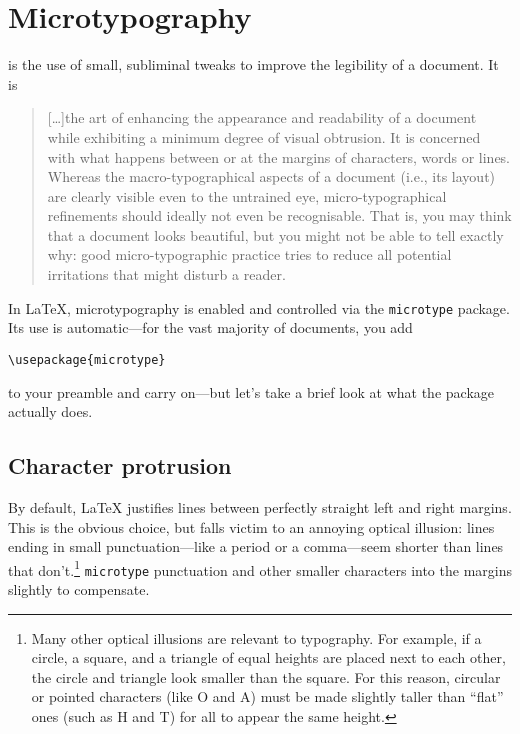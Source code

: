 \chapter{Microtypography}

 is the use of small, subliminal tweaks to improve
the legibility of a document. It is
\begin{quote}
[\ldots]the art of enhancing the appearance and readability of a
document while exhibiting a minimum degree of visual obtrusion.
It is concerned with what happens between or at the margins of characters,
words or lines. Whereas the macro-typographical aspects of a document
(i.e., its layout) are clearly visible even to the untrained eye,
micro-typographical refinements should ideally not even be recognisable.
That is, you may think that a document looks beautiful, but you
might not be able to tell exactly why: good micro-typographic practice tries to
reduce all potential irritations that might disturb a reader.\punckern{}
\end{quote}

In \LaTeX{}, microtypography is enabled and controlled via the
\texttt{microtype} package.
Its use is automatic---for the vast majority of documents, you add
\begin{leftfigure}
\begin{lstlisting}
\usepackage{microtype}
\end{lstlisting}
\end{leftfigure}
to your preamble and carry on---but let's take a brief look at what the package
actually does.

\section{Character protrusion}

By default, \LaTeX{} justifies lines between perfectly straight
left and right margins.
This is the obvious choice,
but falls victim to an annoying optical illusion:
lines ending in small punctuation---like a period or a
comma---seem shorter than lines that
don't.\punckern\footnote{Many other optical illusions are
relevant to typography. For example, if a circle, a square, and a triangle
of equal heights are placed next to each other,
the circle and triangle look smaller than the square.
For this reason, circular or pointed characters (like O and A) must
be made slightly taller than ``flat'' ones (such as H and T) for all
to appear the same height.\punckern{}}
\texttt{microtype}  punctuation and other smaller
characters into the margins slightly to compensate.

